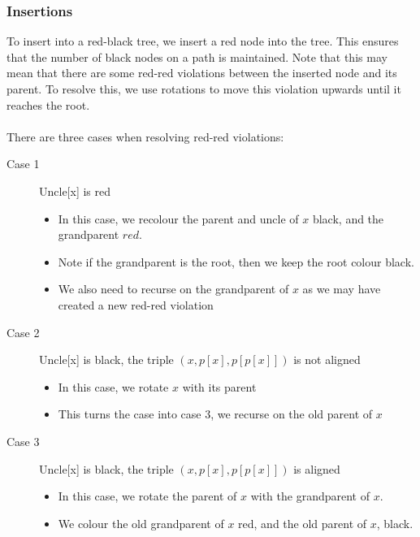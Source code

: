 \documentclass{article}
\theoremstyle{plain}
\theoremstyle{definition}
\begin{document}
        \subsubsection{Insertions}
            To insert into a red-black tree, we insert a red node into the tree. This ensures that the number of black nodes on a path is maintained. Note that this may mean that there are some red-red violations between the inserted node and its parent. To resolve this, we use rotations to move this violation upwards until it reaches the root. \\ \\
            There are three cases when resolving red-red violations:
            \begin{description}
            \item[Case 1] Uncle[x] is red
                \begin{itemize}
                    \item In this case, we recolour the parent and uncle of $x$ black, and the grandparent $red$. 
                    \item Note if the grandparent is the root, then we keep the root colour black.
                    \item We also need to recurse on the grandparent of $x$ as we may have created a new red-red violation
                \end{itemize}
            \item[Case 2] Uncle[x] is black, the triple $(x, p[x], p[p[x]])$ is not aligned
                \begin{itemize}
                    \item In this case, we rotate $x$ with its parent
                    \item This turns the case into case 3, we recurse on the old parent of $x$
                \end{itemize}
            \item[Case 3] Uncle[x] is black, the triple $(x, p[x], p[p[x]])$ is aligned
                \begin{itemize}
                    \item In this case, we rotate the parent of $x$ with the grandparent of $x$. 
                    \item We colour the old grandparent of $x$ red, and the old parent of $x$, black. 
                \end{itemize}
            \end{description}
\end{document}
